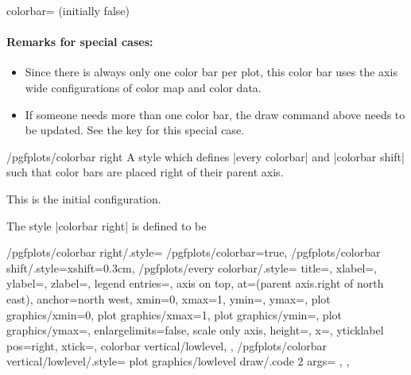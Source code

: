 \begin{pgfplotskey}{colorbar= (initially false)}
	\paragraph{Remarks for special cases:}
	\begin{itemize}
		\item Since there is always only one color bar per plot, this color bar uses the axis wide configurations of color map and color data.
		\item If someone needs more than one color bar, the draw command above needs to be updated. See the key 
		 for this special case.
	\end{itemize}
\end{pgfplotskey}

\begin{stylekey}{/pgfplots/colorbar right}
	A style which defines |every colorbar| and |colorbar shift| such that color bars are placed right of their parent axis.

	This is the initial configuration.
\begin{codeexample}[]
\end{codeexample}
	
	The style |colorbar right| is defined to be
\begin{codeexample}
/pgfplots/colorbar right/.style={%
	/pgfplots/colorbar=true,
	/pgfplots/colorbar shift/.style={xshift=0.3cm},
	/pgfplots/every colorbar/.style={%
		title=,
		xlabel=,
		ylabel=,
		zlabel=,
		legend entries=,
		axis on top,
		at={(parent axis.right of north east)},
		anchor=north west,
		xmin=0,
		xmax=1,
		ymin=,
		ymax=,
		plot graphics/xmin=0,%
		plot graphics/xmax=1,
		plot graphics/ymin=,
		plot graphics/ymax=,
		enlargelimits=false,
		scale only axis,
		height=,%
		x=,
		yticklabel pos=right,
		xtick=\empty,
		colorbar vertical/lowlevel,
	}%
},%
/pgfplots/colorbar vertical/lowlevel/.style={%
	plot graphics/lowlevel draw/.code 2 args={%
		\pgfplots@loc@TMPa
		\def\pgfplots@loc@TMPb{%
			\pgfdeclareverticalshading{tempshading}{\pgfkeysvalueof{/pgfplots/colorbar/width}}}%
		\expandafter\pgfplots@loc@TMPb\expandafter{\pgfplots@loc@TMPa}%
	},%
},
\end{codeexample}
\end{stylekey}

